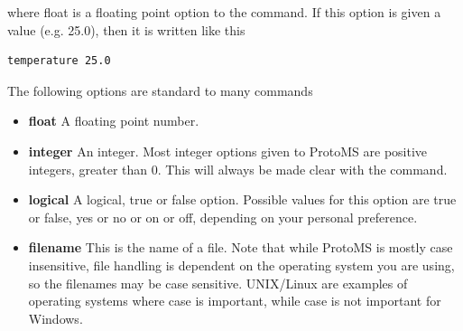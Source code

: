 \documentclass[letterpaper,10pt,english]{sphinxmanual}
\begin{document}
where float is a floating point option to the command. If this option is given a value (e.g. 25.0), then it is written like this

\begin{Verbatim}[commandchars=\\\{\}]
temperature 25.0
\end{Verbatim}

The following options are standard to many commands
\begin{itemize}
\item {} 
\textbf{float} A floating point number.

\item {} 
\textbf{integer} An integer. Most integer options given to ProtoMS are positive integers, greater than 0. This will always be made clear with the command.

\item {} 
\textbf{logical} A logical, true or false option. Possible values for this option are true or false, yes or no or on or off, depending on your personal preference.

\item {} 
\textbf{filename} This is the name of a file. Note that while ProtoMS is mostly case insensitive, file handling is dependent on the operating system you are using, so the filenames may be case sensitive. UNIX/Linux are examples of operating systems where case is important, while case is not important for Windows.

\end{itemize}
\end{document}
